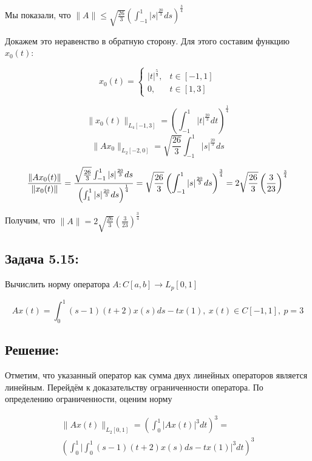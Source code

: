 \documentclass[12pt, a4paper]{report}
\begin{document}
Мы показали, что $\| A \| \le  \sqrt{\frac{26}{3}} \left( \int_{ - 1}^{1} |s|^\frac{20}{3} ds \right)^\frac{3}{4}$

Докажем это неравенство в обратную сторону. Для этого составим функцию $x_0(t)$:

\begin{equation*}
    x_0(t) = 
    \begin{cases}
        |t|^\frac{5}{3}, & t \in [ - 1, 1]\\
        0, & t \in [1, 3]
    \end{cases}
\end{equation*}

\[ \| x_0(t) \|_{L_4[ - 1, 3]} = \left( \int_{ - 1}^{1} |t|^\frac{20}{3} dt \right)^\frac{1}{4}\]
\[ \| A x_0 \|_{L_2[ - 2, 0]} = \sqrt{\frac{26}{3}} \int_{ - 1}^{1} |s|^\frac{20}{3} ds \]

\[\frac{\| Ax_0(t)\|}{\| x_0(t) \|} = \frac{\sqrt{\frac{26}{3}} \int_{-1}^{1} |s|^\frac{20}{3} ds}{\left( \int_{ 1}^{1} |s|^\frac{20}{3} ds \right)^\frac{1}{4}} =\\
\sqrt{\frac{26}{3}} \left( \int_{ - 1}^{1} |s|^\frac{20}{3} ds \right)^\frac{3}{4} = \\
2 \sqrt{\frac{26}{3}} \left( \frac{3}{23} \right)^\frac{3}{4} \]

Получим, что $\| A \| = 2 \sqrt{\frac{26}{3}} \left( \frac{3}{23} \right)^\frac{3}{4} $


\subsection*{Задача 5.15:}

Вычислить норму оператора $A: C[a, b] \to L_p[0, 1]$

\[Ax(t) = \int_{0}^{1}(s - 1)(t+2)x(s)ds - tx(1),\ x(t) \in C[-1, 1],\ p = 3\]

\subsection*{Решение:}
Отметим, что указанный оператор как сумма двух линейных операторов является линейным.
Перейдём к доказательству ограниченности оператора. По определению ограниченности,
оценим норму

\begin{align*}
    \|Ax(t)\|_{L_2[0, 1]} = \left( \int_{0}^{1} \Big| Ax(t) \Big|^3 dt \right)^3 =\\
    \left( \int_{0}^{1} \Big| \int_{0}^{1} (s-1)(t+2)x(s)ds - tx(1) \Big|^3 dt \right)^3    
\end{align*}
\end{document}
